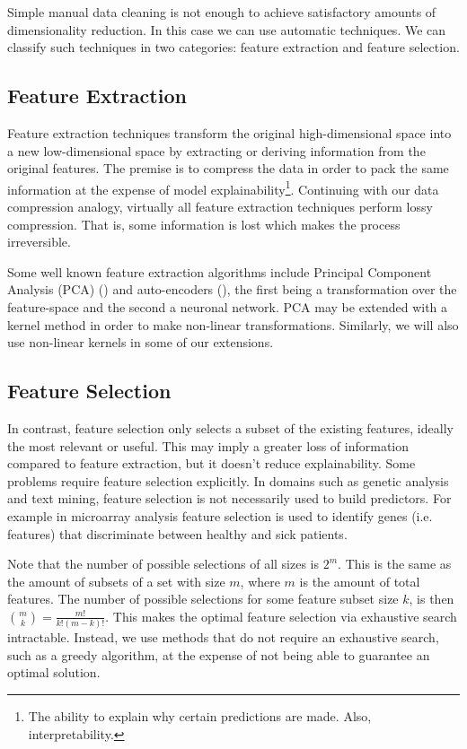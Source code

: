 Simple manual data cleaning is not enough to achieve satisfactory amounts of dimensionality reduction. In this case we can use automatic techniques. We can classify such techniques in two categories: feature extraction and feature selection.

\subsection{Feature Extraction}

Feature extraction techniques transform the original high-dimensional space into a new low-dimensional space by extracting or deriving information from the original features. The premise is to compress the data in order to pack the same information at the expense of model explainability\footnote{The ability to explain why certain predictions are made. Also, interpretability.}. Continuing with our data compression analogy, virtually all feature extraction techniques perform lossy com\-pres\-sion. That is, some information is lost which makes the process irreversible. 

Some well known feature extraction algorithms include Principal Component Analysis (PCA) (\cite{scholkopf_kernel_1997}) and auto-encoders (\cite{vincent_extracting_2008}), the first being a transformation over the feature-space and the second a neuronal network. PCA may be extended with a kernel method in order to make non-linear transformations. Similarly, we will also use non-linear kernels in some of our extensions.

\subsection{Feature Selection}
\label{sec:ch1.feature_selection}

In contrast, feature selection only selects a subset of the existing features, ideally the most relevant or useful. This may imply a greater loss of information compared to feature extraction, but it doesn't reduce explainability. Some problems require feature selection explicitly. In domains such as genetic analysis and text mining, feature selection is not necessarily used to build predictors. For example in micro\-array analysis feature selection is used to identify genes (i.e. features) that dis\-criminate between healthy and sick patients. 

Note that the number of possible selections of all sizes is $2^m$. This is the same as the amount of subsets of a set with size $m$, where $m$ is the amount of total features. The number of possible selections for some feature subset size $k$, is then ${m \choose k} = \frac{m!}{k!(m - k)!}$. This makes the optimal feature selection via exhaustive search intractable. Instead, we use methods that do not require an exhaustive search, such as a greedy algorithm, at the expense of not being able to guarantee an optimal solution.

